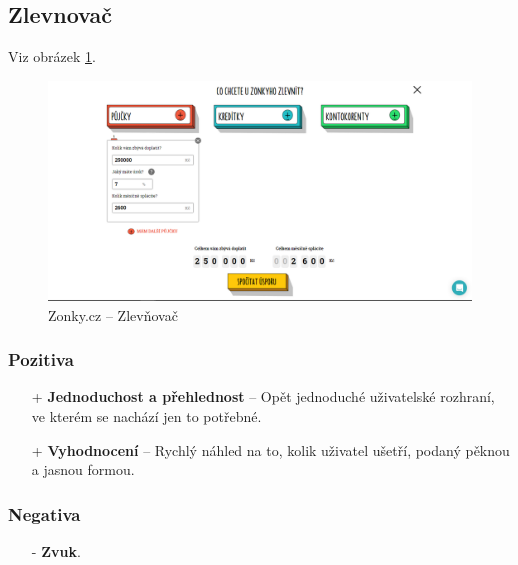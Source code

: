 \newpage
\subsection{Zlevnovač}
Viz obrázek \ref{fig:zonky:zlevnovac}. %
\begin{figure}[h]
    \centering
    \includegraphics[width=1.0\textwidth]{media/zonky/zlevnovac.png}
    \caption{Zonky.cz -- Zlevňovač}
    \label{fig:zonky:zlevnovac}
\end{figure}
\subsubsection*{Pozitiva}
\begin{itemize}
    \item[+] \textbf{Jednoduchost a přehlednost} -- Opět jednoduché uživatelské rozhraní, ve kterém se nachází jen to potřebné.
    \item[+] \textbf{Vyhodnocení} -- Rychlý náhled na to, kolik uživatel ušetří, podaný pěknou a jasnou formou.
\end{itemize}
\subsubsection*{Negativa}
\begin{itemize}
    \item[-] \textbf{Zvuk}.
\end{itemize}



